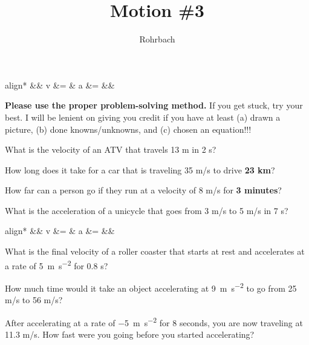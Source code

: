 \documentclass[12pt]{exam}
\title{Motion \#3}
\author{Rohrbach}
\newcommand{\printeqs}{
  \begin{center}
    \vspace{-1cm}
    \begin{empheq}[box=\fbox]{align*}
     && v &= \frac{d}{t}    &    a &= \frac{v_f-v_i}{t} &&
    \end{empheq}
  \end{center}
}
\begin{document}
\maketitle

\printeqs

\noindent
{\bf Please use the proper problem-solving method.}  If you 
get stuck, try your best.  I will be lenient on giving you
credit if you have at least (a) drawn a picture, 
(b) done knowns/unknowns, and (c) chosen an equation!!!


\begin{questions}

\question
  What is the velocity of an ATV that travels 13 m in 2 s?

\question
  How long does it take for a car that is traveling 
  35 m/s to drive {\bf 23 km}?

\question
  How far can a person go if they run at a velocity of 
  8 m/s for {\bf 3 minutes}?

\question
  What is the acceleration of a unicycle that goes from 
  3 m/s to 5 m/s in 7 s?

\pagebreak

\printeqs


\question
  What is the final velocity of a roller coaster 
  that starts at rest and accelerates at a rate of 
  \SI{5}{\meter\per\second^2} for 0.8 s?


\question
  How much time would it take an object accelerating 
  at \SI{9}{\meter\per\second^2} to go from 25 m/s to 56 m/s?


\question
  After accelerating at a rate of \SI{-5}{\meter\per\second^2}
  for 8 seconds, you are now traveling at 11.3 m/s.  How fast 
  were you going before you started accelerating?



  
\end{questions}
\end{document}
